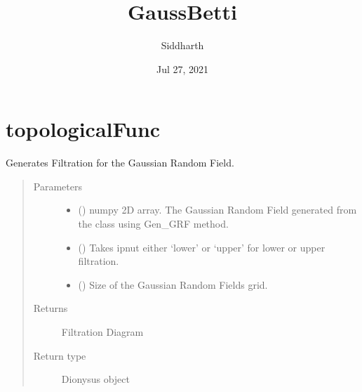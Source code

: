 \documentclass[letterpaper,10pt,english]{sphinxmanual}
\title{GaussBetti}
\date{Jul 27, 2021}
\author{Siddharth}
\begin{document}
\pagestyle{empty}
\sphinxmaketitle
\pagestyle{plain}
\sphinxtableofcontents
\pagestyle{normal}
\label{\detokenize{index::doc}}



\chapter{topologicalFunc}
\label{\detokenize{topologicalFunc:topologicalfunc}}\label{\detokenize{topologicalFunc:id1}}\label{\detokenize{topologicalFunc::doc}}\label{\detokenize{topologicalFunc:module-topologicalFunc}}

\begin{fulllineitems}
\label{\detokenize{topologicalFunc:topologicalFunc.GaussianFiltration}}
\sphinxAtStartPar
Generates Filtration for the Gaussian Random Field.
\begin{quote}\begin{description}
\item[{Parameters}] \leavevmode\begin{itemize}
\item {} 
\sphinxAtStartPar
{} () \textendash{} numpy 2\sphinxhyphen{}D array. The Gaussian Random Field generated from the class using Gen\_GRF method.

\item {} 
\sphinxAtStartPar
{} () \textendash{} Takes ipnut either ‘lower’ or ‘upper’ for lower or upper filtration.

\item {} 
\sphinxAtStartPar
{} () \textendash{} Size of the Gaussian Random Fields grid.

\end{itemize}

\item[{Returns}] \leavevmode
\sphinxAtStartPar
Filtration Diagram

\item[{Return type}] \leavevmode
\sphinxAtStartPar
Dionysus object

\end{description}\end{quote}

\end{fulllineitems}
\end{document}
